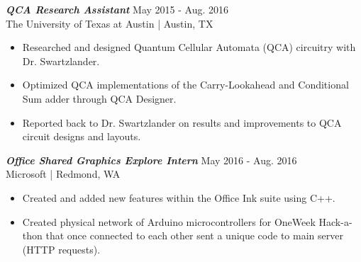 \documentclass[letter]{res}
\begin{document}
\begin{resume}
\vspace{-2mm}

%
%
%

{\sl \textbf{QCA Research Assistant}} \hfill May 2015 - Aug. 2016\\
The University of Texas at Austin | Austin, TX \newline

 \vspace{-4mm}

 \begin{itemize}
 \item Researched and designed Quantum Cellular Automata (QCA) circuitry with Dr. Swartzlander.
 \item Optimized QCA implementations of the Carry-Lookahead and Conditional Sum adder through QCA Designer.
 \item Reported back to Dr. Swartzlander on results and improvements to QCA circuit designs and layouts.
 \end{itemize}

\vspace{-2mm}

{\sl \textbf{Office Shared Graphics Explore Intern}} \hfill May 2016 - Aug. 2016\\
Microsoft | Redmond, WA \newline
 \vspace{-4mm}
  \begin{itemize}
  \item Created and added new features within the Office Ink suite using C++.
  \item Created physical network of Arduino microcontrollers for OneWeek Hack-a-thon that once connected to each other sent a unique code to main server (HTTP requests).
  \end{itemize}

\vspace{-2mm}


\end{resume}
\end{document}
